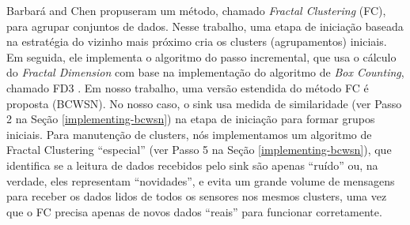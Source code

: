 \documentclass{acm_proc_article-sp}
\begin{document}
Barbará and Chen \cite{Barbara2000} propuseram um método, chamado {\it Fractal
Clustering} (FC), para agrupar conjuntos de dados.
Nesse trabalho, uma etapa de iniciação baseada na estratégia do vizinho mais
próximo cria os clusters (agrupamentos) iniciais. Em seguida, ele implementa o
algoritmo do passo incremental, que usa o cálculo do \textit{Fractal Dimension}
com base na implementação do algoritmo de \textit{Box Counting}, chamado FD3
\cite{Liebovitch1989}. Em nosso trabalho, uma versão estendida do método FC é
proposta (BCWSN). No nosso caso, o sink usa medida de similaridade (ver Passo 2
na Seção \ref{implementing-bcwsn}) na etapa de iniciação para formar grupos
iniciais. Para manutenção de clusters, nós implementamos um algoritmo de Fractal
Clustering “especial” (ver Passo 5 na Seção \ref{implementing-bcwsn}), que
identifica se a leitura de dados recebidos pelo sink são apenas ``ruído'' ou, na
verdade, eles representam ``novidades'', e evita um grande volume de mensagens
para receber os dados lidos de todos os sensores nos mesmos clusters, uma vez
que o FC precisa apenas de novos dados ``reais'' para funcionar corretamente.
\vspace*{-.3cm}
\end{document}
